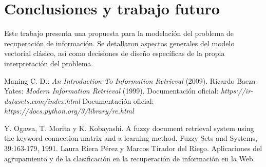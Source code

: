 \documentclass{llncs}
\begin{document}
	\section{Conclusiones y trabajo futuro}
	
	Este trabajo presenta una propuesta para la modelaci\'on del problema de recuperaci\'on de informaci\'on. Se detallaron aspectos generales del modelo vectorial cl\'asico, as\'i como decisiones de dise\~no espec\'ificas de la propia interpretaci\'on del problema. 
	
	\begin{thebibliography}{20}
		 Maning C. D.: \emph{An Introduction To Information Retrieval} (2009).
		 Ricardo Baeza-Yates: \emph{Modern Information Retrieval} (1999).
		 Documentaci\'on oficial: \emph{https://ir-datasets.com/index.html}
		 Documentaci\'on oficial: \emph{https://docs.python.org/3/library/re.html}
		
		 Y. Ogawa, T. Morita y K. Kobayashi. A fuzzy document retrieval system using the keyword connection matrix and a learning method. Fuzzy Sets and Systems, 39:163-179, 1991.		
		 Laura Riera P\'erez y Marcos Tirador del Riego. Aplicaciones del
		agrupamiento y de la clasificación en la recuperaci\'on	de informaci\'on en la Web.
	\end{thebibliography}
	
\end{document}
